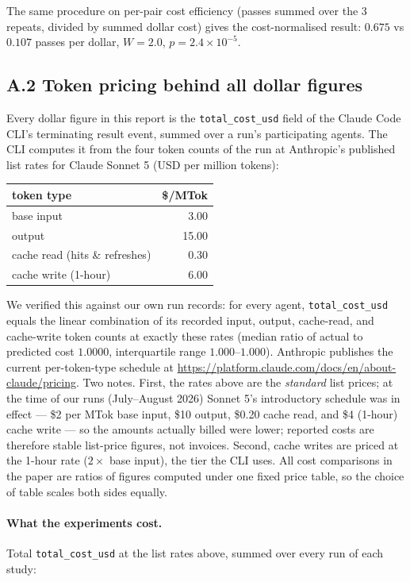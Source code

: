 \documentclass[11pt,a4paper]{article}
\begin{document}
The same procedure on per-pair cost efficiency (passes summed over the 3 repeats, divided by summed dollar cost) gives the cost-normalised result: $0.675$ vs $0.107$ passes per dollar, $W = 2.0$, $p = 2.4 \times 10^{-5}$.

\subsection*{A.2 \quad Token pricing behind all dollar figures}

Every dollar figure in this report is the \texttt{total\_cost\_usd} field of the Claude Code CLI's terminating result event, summed over a run's participating agents. The CLI computes it from the four token counts of the run at Anthropic's published list rates for Claude Sonnet 5 (USD per million tokens):

\begin{center}
\begin{tabular}{lr}
\hline
token type & \$/MTok \\
\hline
base input & 3.00 \\
output & 15.00 \\
cache read (hits \& refreshes) & 0.30 \\
cache write (1-hour) & 6.00 \\
\hline
\end{tabular}
\end{center}

We verified this against our own run records: for every agent, \texttt{total\_cost\_usd} equals the linear combination of its recorded input, output, cache-read, and cache-write token counts at exactly these rates (median ratio of actual to predicted cost $1.0000$, interquartile range $1.000$--$1.000$). Anthropic publishes the current per-token-type schedule at \url{https://platform.claude.com/docs/en/about-claude/pricing}. Two notes. First, the rates above are the \emph{standard} list prices; at the time of our runs (July--August 2026) Sonnet 5's introductory schedule was in effect --- \$2 per MTok base input, \$10 output, \$0.20 cache read, and \$4 (1-hour) cache write --- so the amounts actually billed were lower; reported costs are therefore stable list-price figures, not invoices. Second, cache writes are priced at the 1-hour rate ($2\times$ base input), the tier the CLI uses. All cost comparisons in the paper are ratios of figures computed under one fixed price table, so the choice of table scales both sides equally.

\paragraph{What the experiments cost.} Total \texttt{total\_cost\_usd} at the list rates above, summed over every run of each study:
\end{document}
